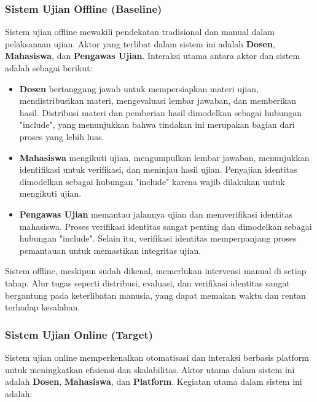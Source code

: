 \subsubsection{Sistem Ujian Offline (Baseline)}

Sistem ujian offline mewakili pendekatan tradisional dan manual dalam pelaksanaan ujian. Aktor yang terlibat dalam sistem ini adalah \textbf{Dosen}, \textbf{Mahasiswa}, dan \textbf{Pengawas Ujian}. Interaksi utama antara aktor dan sistem adalah sebagai berikut:

\begin{itemize}
	\item \textbf{Dosen} bertanggung jawab untuk mempersiapkan materi ujian, mendistribusikan materi, mengevaluasi lembar jawaban, dan memberikan hasil. Distribusi materi dan pemberian hasil dimodelkan sebagai hubungan "include", yang menunjukkan bahwa tindakan ini merupakan bagian dari proses yang lebih luas.
	\item \textbf{Mahasiswa} mengikuti ujian, mengumpulkan lembar jawaban, menunjukkan identifikasi untuk verifikasi, dan meninjau hasil ujian. Penyajian identitas dimodelkan sebagai hubungan "include" karena wajib dilakukan untuk mengikuti ujian.
	\item \textbf{Pengawas Ujian} memantau jalannya ujian dan memverifikasi identitas mahasiswa. Proses verifikasi identitas sangat penting dan dimodelkan sebagai hubungan "include". Selain itu, verifikasi identitas memperpanjang proses pemantauan untuk memastikan integritas ujian.
\end{itemize}

Sistem offline, meskipun sudah dikenal, memerlukan intervensi manual di setiap tahap. Alur tugas seperti distribusi, evaluasi, dan verifikasi identitas sangat bergantung pada keterlibatan manusia, yang dapat memakan waktu dan rentan terhadap kesalahan.

\subsubsection{Sistem Ujian Online (Target)}

Sistem ujian online memperkenalkan otomatisasi dan interaksi berbasis platform untuk meningkatkan efisiensi dan skalabilitas. Aktor utama dalam sistem ini adalah \textbf{Dosen}, \textbf{Mahasiswa}, dan \textbf{Platform}. Kegiatan utama dalam sistem ini adalah:

